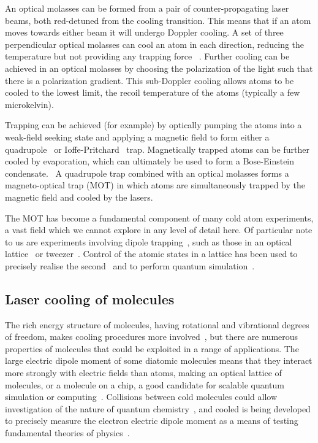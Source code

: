 An optical molasses can be formed from a pair of counter-propagating laser
beams, both red-detuned from the cooling transition. This means that if an atom
moves towards either beam it will undergo Doppler cooling.  A set of three
perpendicular optical molasses can cool an atom in each direction, reducing the
temperature but not providing any trapping force~\cite{Metcalf1999} . Further
cooling can be achieved in an optical molasses by choosing the polarization of
the light such that there is a polarization gradient. This sub-Doppler cooling
allows atoms to be cooled to the lowest limit, the recoil temperature of the
atoms (typically a few microkelvin).~\cite{Dalibard:89}

Trapping can be achieved (for example) by optically pumping the atoms into a
weak-field seeking state and applying a magnetic field to form either a
quadrupole~\cite{PhysRevLett.54.2596} or
Ioffe-Pritchard~\cite{PhysRevLett.51.1336} trap.  Magnetically trapped atoms can be
further cooled by evaporation, which can ultimately be used to form a
Bose-Einstein condensate.~\cite{Anderson198} A quadrupole trap combined with an
optical molasses forms a magneto-optical trap (MOT) in which atoms are
simultaneously trapped by the magnetic field and cooled by the
lasers.~\cite{PhysRevLett.59.2631}

The MOT has become a fundamental component of many cold atom experiments, a vast
field which we cannot explore in any level of detail here. Of particular note to
us are experiments involving dipole trapping~\cite{PhysRevA.47.R4567}, such as
those in an optical lattice~\cite{Bakr2009} or tweezer~\cite{Ashkin:86}. Control
of the atomic states in a lattice has been used to precisely realise the
second~\cite{PhysRevLett.120.103201} and to perform quantum
simulation~\cite{Gross995}.

\subsection{Laser cooling of molecules}

The rich energy structure of molecules, having rotational and vibrational
degrees of freedom, makes cooling procedures more involved~\cite{Tarbutt2018,
1367-2630-17-1-015007}, but there are numerous properties of molecules that
could be exploited in a range of applications. The large electric dipole moment
of some diatomic molecules means that they interact more strongly with electric
fields than atoms, making an optical lattice of molecules, or a molecule on a
chip, a good candidate for scalable quantum simulation or
computing~\cite{Micheli2006, Andre2006}.  Collisions between cold molecules
could allow investigation of the nature of quantum chemistry~\cite{Krems2008},
and cooled \YbF{} is being developed to precisely measure the electron electric
dipole moment as a means of testing fundamental theories of
physics~\cite{Lim2018}.


